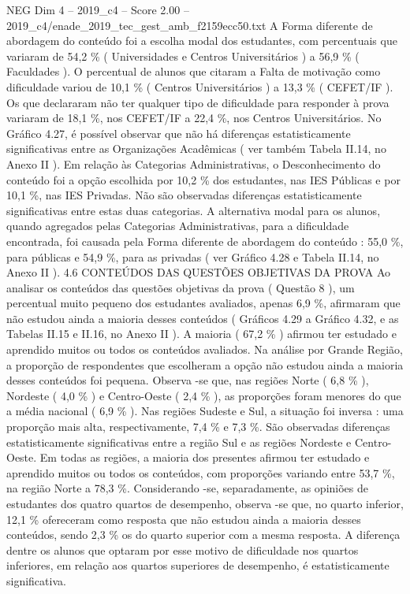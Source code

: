 \begin{textsample}{NEG Dim 4 – 2019\_c4 – Score 2.00 – 2019\_c4/enade\_2019\_tec\_gest\_amb\_f2159ecc50.txt}
A Forma diferente de abordagem do conteúdo foi a escolha modal dos estudantes, com percentuais que variaram de 54,2 \% ( Universidades e Centros Universitários ) a 56,9 \% ( Faculdades ).
O percentual de alunos que citaram a Falta de motivação como dificuldade variou de 10,1 \% ( Centros Universitários ) a 13,3 \% ( CEFET/IF ).
Os que declararam não ter qualquer tipo de dificuldade para responder à prova variaram de 18,1 \%, nos CEFET/IF a 22,4 \%, nos Centros Universitários.
No Gráfico 4.27, é possível observar que não há diferenças estatisticamente significativas entre as Organizações Acadêmicas ( ver também Tabela II.14, no Anexo II ).
Em relação às Categorias Administrativas, o Desconhecimento do conteúdo foi a opção escolhida por 10,2 \% dos estudantes, nas IES Públicas e por 10,1 \%, nas IES Privadas.
Não são observadas diferenças estatisticamente significativas entre estas duas categorias.
A alternativa modal para os alunos, quando agregados pelas Categorias Administrativas, para a dificuldade encontrada, foi causada pela Forma diferente de abordagem do conteúdo : 55,0 \%, para públicas e 54,9 \%, para as privadas ( ver Gráfico 4.28 e Tabela II.14, no Anexo II ). 4.6 CONTEÚDOS DAS QUESTÕES OBJETIVAS DA PROVA Ao analisar os conteúdos das questões objetivas da prova ( Questão 8 ), um percentual muito pequeno dos estudantes avaliados, apenas 6,9 \%, afirmaram que não estudou ainda a maioria desses conteúdos ( Gráficos 4.29 a Gráfico 4.32, e as Tabelas II.15 e II.16, no Anexo II ).
A maioria ( 67,2 \% ) afirmou ter estudado e aprendido muitos ou todos os conteúdos avaliados.
Na análise por Grande Região, a proporção de respondentes que escolheram a opção não estudou ainda a maioria desses conteúdos foi pequena.
Observa -se que, nas regiões Norte ( 6,8 \% ), Nordeste ( 4,0 \% ) e Centro-Oeste ( 2,4 \% ), as proporções foram menores do que a média nacional ( 6,9 \% ).
Nas regiões Sudeste e Sul, a situação foi inversa : uma proporção mais alta, respectivamente, 7,4 \% e 7,3 \%.
São observadas diferenças estatisticamente significativas entre a região Sul e as regiões Nordeste e Centro-Oeste.
Em todas as regiões, a maioria dos presentes afirmou ter estudado e aprendido muitos ou todos os conteúdos, com proporções variando entre 53,7 \%, na região Norte a 78,3 \%.
Considerando -se, separadamente, as opiniões de estudantes dos quatro quartos de desempenho, observa -se que, no quarto inferior, 12,1 \% ofereceram como resposta que não estudou ainda a maioria desses conteúdos, sendo 2,3 \% os do quarto superior com a mesma resposta.
A diferença dentre os alunos que optaram por esse motivo de dificuldade nos quartos inferiores, em relação aos quartos superiores de desempenho, é estatisticamente significativa.

\end{textsample}
